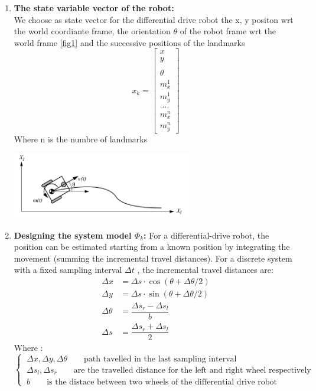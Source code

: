 \documentclass[11pt,a4paper]{report}
\begin{document}
\begin{enumerate}
\item \textbf{The state variable vector of the robot:}\\
We choose as state vector for the differential drive robot the x, y positon wrt the world coordiante frame, the orientation $\theta$ of the robot frame wrt the world frame \ref{fig1} and the successive positions of the landmarks 	
$$ x_{k} = \left[ \begin{array}{c} x\\ y\\ \\ \theta \\ m_{x}^1\\ m_{y}^1 \\ .... \\ m_{x}^n \\ m_{y}^n  \end{array}\right]$$ 
Where n is the numbre of landmarks

\begin{center}\label{fig1}
	\includegraphics[width=8cm]{Capture1.png}
\end{center}

\item \textbf{Designing the system model $\Phi_{k}$:}
For a differential-drive robot, the position can be estimated starting from a known position by integrating the movement (summing the incremental travel distances).
For a discrete system with a fixed sampling interval $\Delta t$ , the incremental travel distances are:
\begin{eqnarray}
\Delta x &= \Delta s \cdot \cos (\theta + \Delta \theta /2) \nonumber\\
\Delta y &= \Delta s \cdot \sin (\theta + \Delta \theta /2) \nonumber\\
\Delta \theta &= \dfrac{\Delta s_{r} - \Delta s_{l}}{b} \label{eq1}\\
\Delta s &= \dfrac{\Delta s_{r} + \Delta s_{l}}{2} \label{eq2}
\end{eqnarray}
Where : \qquad $ \left\{\ \begin{array}{l} \Delta x, \Delta y , \Delta \theta \qquad \textrm{path tavelled in the last sampling interval} \\
\Delta s_{l}  ,\Delta s_{r} \qquad \textrm{are the travelled distance for the left and right wheel respectively } \\
b \qquad \textrm{is the distace between two wheels of the differential drive robot}
\end{array}\right.  
$ 


\end{enumerate}
\end{document}
